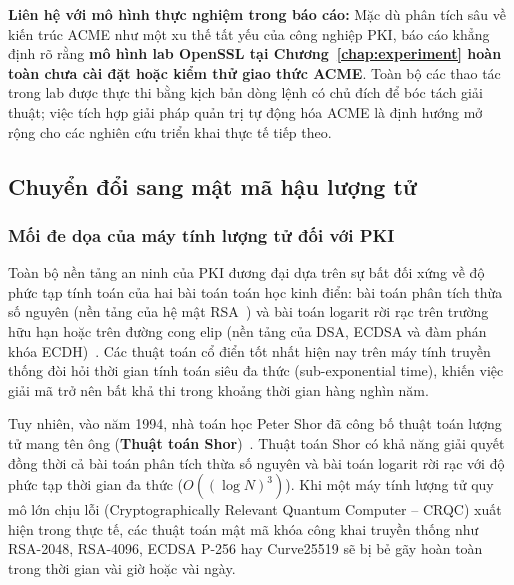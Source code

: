 \noindent\textbf{Liên hệ với mô hình thực nghiệm trong báo cáo:} Mặc dù phân tích sâu về kiến trúc ACME như một xu thế tất yếu của công nghiệp PKI, báo cáo khẳng định rõ rằng \textbf{mô hình lab OpenSSL tại Chương~\ref{chap:experiment} hoàn toàn chưa cài đặt hoặc kiểm thử giao thức ACME}. Toàn bộ các thao tác trong lab được thực thi bằng kịch bản dòng lệnh có chủ đích để bóc tách giải thuật; việc tích hợp giải pháp quản trị tự động hóa ACME là định hướng mở rộng cho các nghiên cứu triển khai thực tế tiếp theo.

\subsection{Chuyển đổi sang mật mã hậu lượng tử}
\label{sec:pqc-migration}

\subsubsection{Mối đe dọa của máy tính lượng tử đối với PKI}
Toàn bộ nền tảng an ninh của PKI đương đại dựa trên sự bất đối xứng về độ phức tạp tính toán của hai bài toán toán học kinh điển: bài toán phân tích thừa số nguyên (nền tảng của hệ mật RSA~\cite{rsa1978}) và bài toán logarit rời rạc trên trường hữu hạn hoặc trên đường cong elip (nền tảng của DSA, ECDSA và đàm phán khóa ECDH)~\cite{diffie1976new}. Các thuật toán cổ điển tốt nhất hiện nay trên máy tính truyền thống đòi hỏi thời gian tính toán siêu đa thức (sub-exponential time), khiến việc giải mã trở nên bất khả thi trong khoảng thời gian hàng nghìn năm.

Tuy nhiên, vào năm 1994, nhà toán học Peter Shor đã công bố thuật toán lượng tử mang tên ông (\textbf{Thuật toán Shor})~\cite{shor1994}. Thuật toán Shor có khả năng giải quyết đồng thời cả bài toán phân tích thừa số nguyên và bài toán logarit rời rạc với độ phức tạp thời gian đa thức ($O((\log N)^3)$). Khi một máy tính lượng tử quy mô lớn chịu lỗi (Cryptographically Relevant Quantum Computer -- CRQC) xuất hiện trong thực tế, các thuật toán mật mã khóa công khai truyền thống như RSA-2048, RSA-4096, ECDSA P-256 hay Curve25519 sẽ bị bẻ gãy hoàn toàn trong thời gian vài giờ hoặc vài ngày.


